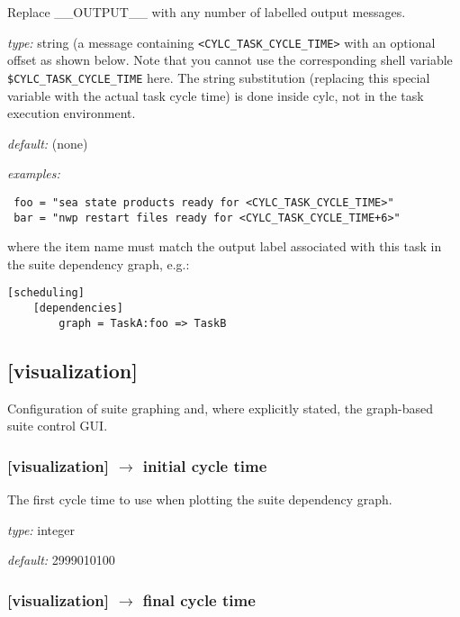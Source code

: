 Replace \_\_OUTPUT\_\_ with any number of labelled output messages. 
\begin{myitemize}
    \item {\em type:} string (a message containing
        \lstinline=<CYLC_TASK_CYCLE_TIME>= with an optional offset as shown
        below. Note that you cannot use the corresponding shell variable
        \lstinline=$CYLC_TASK_CYCLE_TIME= here. The string substitution
        (replacing this special variable with the actual task cycle time) is
        done inside cylc, not in the task execution environment.
\item {\em default:} (none)
\item{ \em examples:}
 \begin{lstlisting}
 foo = "sea state products ready for <CYLC_TASK_CYCLE_TIME>"
 bar = "nwp restart files ready for <CYLC_TASK_CYCLE_TIME+6>"
 \end{lstlisting}
 where the item name must match the output label associated with
 this task in the suite dependency graph, e.g.:
\lstset{language=suiterc}
\begin{lstlisting}
[scheduling]
    [dependencies]
        graph = TaskA:foo => TaskB
 \end{lstlisting}
\end{myitemize}
\lstset{language=transcript}

\subsection{[visualization]}

Configuration of suite graphing and, where explicitly stated, the
graph-based suite control GUI.

\subsubsection[initial cycle time]{[visualization] $\rightarrow$ initial cycle time}

The first cycle time to use when plotting the suite dependency graph.
\begin{myitemize}
    \item {\em type:} integer
    \item {\em default:} 2999010100
\end{myitemize}

\subsubsection[final cycle time]{[visualization] $\rightarrow$ final cycle time}

